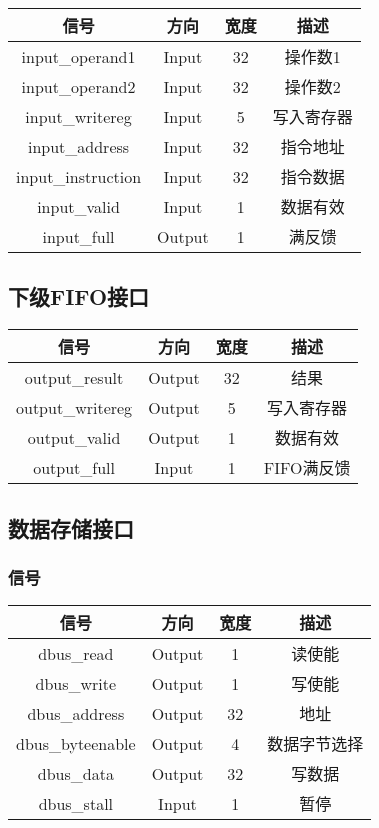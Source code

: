 \documentclass{article}
\newenvironment{signals}{
	\begin{center}
		\begin{tabular}{| c | c | c | c |}
			\hline
			信号 & 方向 & 宽度 & 描述 \\ \hline
}{
		\end{tabular}
	\end{center}
}
\newcommand\sigin{Input}
\newcommand\sigout{Output}
\begin{document}
\begin{signals}
	input\_operand1 & \sigin & 32 & 操作数1 \\ \hline
	input\_operand2 & \sigin & 32 & 操作数2 \\ \hline
	input\_writereg & \sigin & 5 & 写入寄存器 \\ \hline
	input\_address & \sigin & 32 & 指令地址 \\ \hline
	input\_instruction & \sigin & 32 & 指令数据 \\ \hline
	input\_valid & \sigin & 1 & 数据有效 \\ \hline
	input\_full & \sigout & 1 & 满反馈 \\ \hline
\end{signals}

\subsection{下级FIFO接口}

\begin{signals}
	output\_result & \sigout & 32 & 结果 \\ \hline
	output\_writereg & \sigout & 5 & 写入寄存器 \\ \hline
	output\_valid & \sigout & 1 & 数据有效 \\ \hline
	output\_full & \sigin & 1 & FIFO满反馈 \\ \hline
\end{signals}

\subsection{数据存储接口}

\subsubsection{信号}

\begin{signals}
	dbus\_read & \sigout & 1 & 读使能 \\ \hline
	dbus\_write & \sigout & 1 & 写使能 \\ \hline
	dbus\_address & \sigout & 32 & 地址 \\ \hline
	dbus\_byteenable & \sigout & 4 & 数据字节选择 \\ \hline
	dbus\_data & \sigout & 32 & 写数据 \\ \hline
	dbus\_stall & \sigin & 1 & 暂停 \\ \hline
\end{signals}
\end{document}
